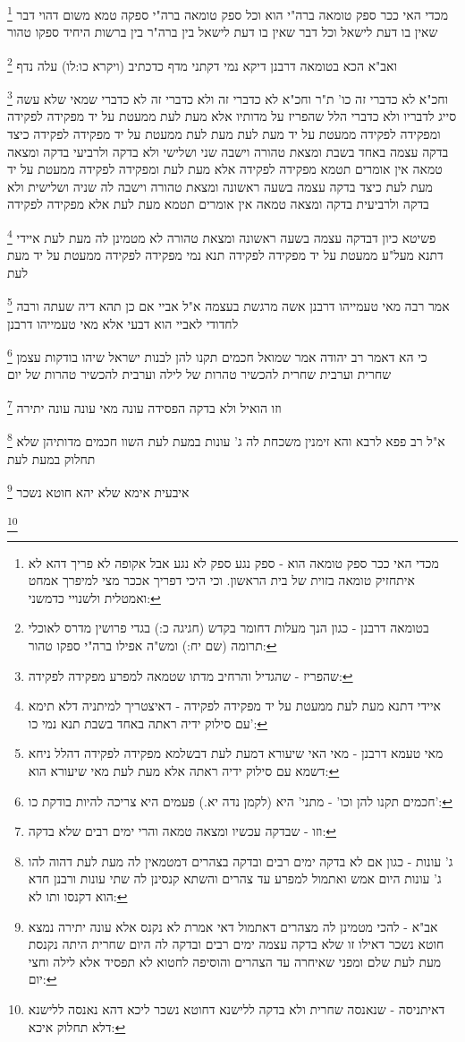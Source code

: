 \documentclass[12pt, openany]{book}
\newcommand{\footnotecomment}[1]{
	\renewcommand\thefootnote{}
	\footnote{#1}}
\newcommand{\commenta}[1]{\footnotecomment{#1}}
\begin{document}
{\commenta{מכדי האי ככר ספק טומאה הוא - ספק נגע ספק לא נגע אבל אקופה לא פריך דהא לא איתחזיק טומאה בזוית של בית הראשון. וכי היכי דפריך אככר מצי למיפרך אמחט ואמטלית ולשנויי כדמשני:}
מכדי האי ככר ספק טומאה ברה"י הוא וכל ספק טומאה ברה"י ספקה טמא משום דהוי דבר שאין בו דעת לישאל וכל דבר שאין בו דעת לישאל בין ברה"ר בין ברשות היחיד ספקו טהור 
\commenta{בטומאה דרבנן - כגון הנך מעלות דחומר בקדש (חגיגה כ:) בגדי פרושין מדרס לאוכלי תרומה (שם יח:) ומש"ה אפילו ברה"י ספקו טהור:}
ואב"א הכא בטומאה דרבנן דיקא נמי דקתני מדף כדכתיב (ויקרא כו:לו) עלה נדף
\commenta{שהפריז - שהגדיל והרחיב מדתו שטמאה למפרע מפקידה לפקידה:}
וחכ"א לא כדברי זה כו' ת"ר וחכ"א לא כדברי זה ולא כדברי זה לא כדברי שמאי שלא עשה סייג לדבריו ולא כדברי הלל שהפריז על מדותיו 
אלא מעת לעת ממעטת על יד מפקידה לפקידה ומפקידה לפקידה ממעטת על יד מעת לעת 
מעת לעת ממעטת על יד מפקידה לפקידה כיצד בדקה עצמה באחד בשבת ומצאת טהורה וישבה שני ושלישי ולא בדקה ולרביעי בדקה ומצאה טמאה אין אומרים תטמא מפקידה לפקידה אלא מעת לעת 
ומפקידה לפקידה ממעטת על יד מעת לעת כיצד בדקה עצמה בשעה ראשונה ומצאת טהורה וישבה לה שניה ושלישית ולא בדקה ולרביעית בדקה ומצאה טמאה אין אומרים תטמא מעת לעת אלא מפקידה לפקידה 
\commenta{איידי דתנא מעת לעת ממעטת על יד מפקידה לפקידה - דאיצטריך למיתניה דלא תימא עם סילוק ידיה ראתה באחד בשבת תנא נמי כו':}
פשיטא כיון דבדקה עצמה בשעה ראשונה ומצאת טהורה לא מטמינן לה מעת לעת איידי דתנא מעל"ע ממעטת על יד מפקידה לפקידה תנא נמי מפקידה לפקידה ממעטת על יד מעת לעת 
\commenta{מאי טעמא דרבנן - מאי האי שיעורא דמעת לעת דבשלמא מפקידה לפקידה דהלל ניחא דשמא עם סילוק ידיה ראתה אלא מעת לעת מאי שיעורא הוא:}
אמר רבה מאי טעמייהו דרבנן אשה מרגשת בעצמה א"ל אביי אם כן תהא דיה שעתה ורבה לחדודי לאביי הוא דבעי אלא מאי טעמייהו דרבנן 
\commenta{חכמים תקנו להן וכו' - מתני' היא (לקמן נדה יא.) פעמים היא צריכה להיות בודקת כו':}
כי הא דאמר רב יהודה אמר שמואל חכמים תקנו להן לבנות ישראל שיהו בודקות עצמן שחרית וערבית שחרית להכשיר טהרות של לילה וערבית להכשיר טהרות של יום 
\commenta{וזו - שבדקה עכשיו ומצאה טמאה והרי ימים רבים שלא בדקה:}
וזו הואיל ולא בדקה הפסידה עונה מאי עונה עונה יתירה 
\commenta{ג' עונות - כגון אם לא בדקה ימים רבים ובדקה בצהרים דמטמאין לה מעת לעת דהוה להו ג' עונות היום אמש ואתמול למפרע עד צהרים והשתא קנסינן לה שתי עונות ורבנן חדא הוא דקנסו ותו לא:}
א"ל רב פפא לרבא והא זימנין משכחת לה ג' עונות במעת לעת השוו חכמים מדותיהן שלא תחלוק במעת לעת 
\commenta{אב"א - להכי מטמינן לה מצהרים דאתמול דאי אמרת לא נקנס אלא עונה יתירה נמצא חוטא נשכר דאילו זו שלא בדקה עצמה ימים רבים ובדקה לה היום שחרית היתה נקנסת מעת לעת שלם ומפני שאיחרה עד הצהרים והוסיפה לחטוא לא תפסיד אלא לילה וחצי יום:}
איבעית אימא שלא יהא חוטא נשכר 
\commenta{דאיתניסה - שנאנסה שחרית ולא בדקה ללישנא דחוטא נשכר ליכא דהא נאנסה ללישנא דלא תחלוק איכא:}
}
\end{document}
